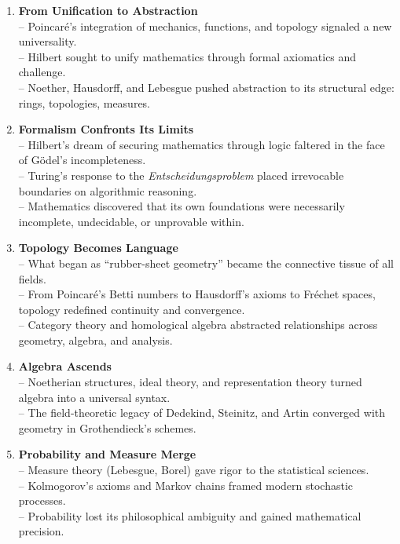 \documentclass[9pt]{article}
\begin{document}
\begin{enumerate}
  \item \textbf{From Unification to Abstraction} \\
  -- Poincaré’s integration of mechanics, functions, and topology signaled a new universality. \\
  -- Hilbert sought to unify mathematics through formal axiomatics and challenge. \\
  -- Noether, Hausdorff, and Lebesgue pushed abstraction to its structural edge: rings, topologies, measures.

  \item \textbf{Formalism Confronts Its Limits} \\
  -- Hilbert’s dream of securing mathematics through logic faltered in the face of Gödel’s incompleteness. \\
  -- Turing’s response to the \textit{Entscheidungsproblem} placed irrevocable boundaries on algorithmic reasoning. \\
  -- Mathematics discovered that its own foundations were necessarily incomplete, undecidable, or unprovable within.

  \item \textbf{Topology Becomes Language} \\
  -- What began as ``rubber-sheet geometry'' became the connective tissue of all fields. \\
  -- From Poincaré’s Betti numbers to Hausdorff’s axioms to Fréchet spaces, topology redefined continuity and convergence. \\
  -- Category theory and homological algebra abstracted relationships across geometry, algebra, and analysis.

  \item \textbf{Algebra Ascends} \\
  -- Noetherian structures, ideal theory, and representation theory turned algebra into a universal syntax. \\
  -- The field-theoretic legacy of Dedekind, Steinitz, and Artin converged with geometry in Grothendieck's schemes.

  \item \textbf{Probability and Measure Merge} \\
  -- Measure theory (Lebesgue, Borel) gave rigor to the statistical sciences. \\
  -- Kolmogorov’s axioms and Markov chains framed modern stochastic processes. \\
  -- Probability lost its philosophical ambiguity and gained mathematical precision.


\end{enumerate}
\end{document}

